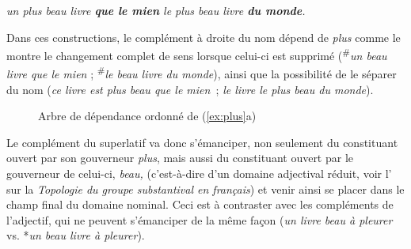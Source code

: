 \ea\label{ex:plus}
\ea \itshape un plus beau livre \textbf{que le mien}
\ex \itshape le plus beau livre \textbf{du monde}.
\z
\z

Dans ces constructions, le complément à droite du nom dépend de \textit{plus} comme le montre le changement complet de sens lorsque celui-ci est supprimé (\textsuperscript{\#}\textit{un beau livre que le mien} ; \textsuperscript{\#}\textit{le beau livre du monde}), ainsi que la possibilité de le séparer du nom (\textit{ce livre est plus beau que le mien~}; \textit{le livre le plus beau du monde}).

\begin{figure}
\caption{\label{fig:plus}Arbre de dépendance ordonné de (\ref{ex:plus}a)}
\end{figure}

Le complément du superlatif va donc s’émanciper, non seulement du constituant ouvert par son gouverneur \textit{plus}, mais aussi du constituant ouvert par le gouverneur de celui-ci, \textit{beau,} (c’est-à-dire d’un domaine adjectival réduit, voir l’ sur la \textit{Topologie du groupe substantival en français}) et venir ainsi se placer dans le champ final du domaine nominal. Ceci est à contraster avec les compléments de l’adjectif, qui ne peuvent s’émanciper de la même façon (\textit{un livre beau à pleurer} vs. *\textit{un beau livre à pleurer}).

